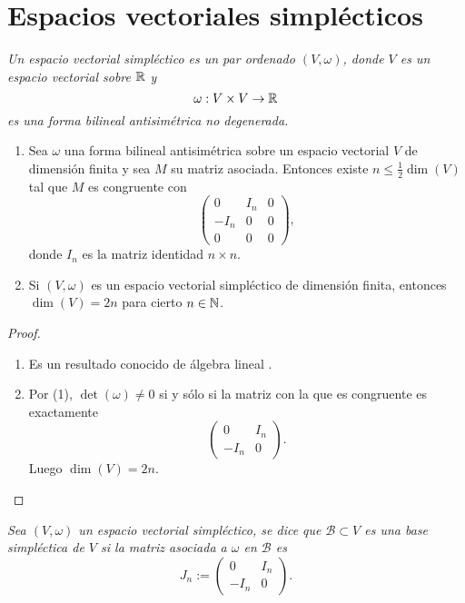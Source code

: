 
\section{Espacios vectoriales simplécticos}\label{sec:vectoriales}
\begin{defn}
  \em
Un \emph{espacio vectorial simpléctico} es un par ordenado $(V,\omega)$, donde $V$ es un espacio vectorial sobre $\mathbb{R}$ y 
	\[
	  \omega: V \times V \rightarrow \mathbb{R}
	\]
	es una forma bilineal antisimétrica no degenerada.
\end{defn}
\begin{prop}\leavevmode
  \begin{enumerate}
    \item Sea $\omega$ una forma bilineal antisimétrica sobre un espacio vectorial $V$ de dimensión finita y sea $M$ su matriz asociada. Entonces existe $n \leq \frac{1}{2}\dim(V)$ tal que $M$ es congruente con
      \[
	\left(
	\begin{array}{ccc}
	  0 & I_n & 0 \\
	  -I_n & 0 & 0 \\
	  0 & 0 & 0
	\end{array}\right),
      \]
      donde $I_n$ es la matriz identidad $n \times n$.
    \item Si $(V,\omega)$ es un espacio vectorial simpléctico de dimensión finita, entonces $\dim(V)=2n$ para cierto $n \in \mathbb{N}$.
  \end{enumerate}
\end{prop}
\begin{proof}\leavevmode
  \begin{enumerate}
    \item Es un resultado conocido de álgebra lineal \cite{algebra}.
    \item Por (1), $\det(\omega) \neq 0$ si y sólo si la matriz con la que es congruente es exactamente 
      \[
\left(
	\begin{array}{cc}
	  0 & I_n  \\
	  -I_n & 0 
	\end{array}\right).
      \]
      Luego $\dim(V)=2n$.
 \end{enumerate}
\end{proof}
\begin{defn}
  \em
  Sea $(V,\omega)$ un espacio vectorial simpléctico, se dice que $\mathcal{B}\subset V$ es una \emph{base simpléctica} de $V$ si la matriz asociada a $\omega$ en $\mathcal{B}$ es
\[
  J_n :=
\left(
	\begin{array}{cc}
	  0 & I_n  \\
	  -I_n & 0 
	\end{array}\right).
      \]
\end{defn}
